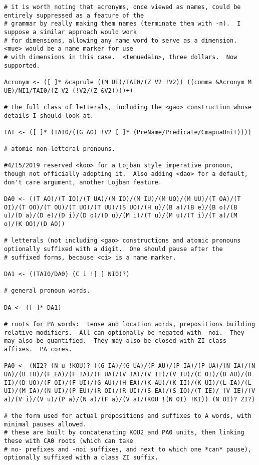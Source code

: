 \documentclass[12pt]{book}
\begin{document}
{\begin{verbatim}
# it is worth noting that acronyms, once viewed as names, could be entirely suppressed as a feature of the
# grammar by really making them names (terminate them with -n).  I suppose a similar approach would work
# for dimensions, allowing any name word to serve as a dimension.  <mue> would be a name marker for use
# with dimensions in this case.  <temuedain>, three dollars.  Now supported.

Acronym <- ([ ]* &caprule ((M UE)/TAI0/(Z V2 !V2)) ((comma &Acronym M UE)/NI1/TAI0/(Z V2 (!V2/(Z &V2))))+)

# the full class of letterals, including the <gao> construction whose details I should look at.

TAI <- ([ ]* (TAI0/((G AO) !V2 [ ]* (PreName/Predicate/CmapuaUnit))))

# atomic non-letteral pronouns.

#4/15/2019 reserved <koo> for a Lojban style imperative pronoun, though not officially adopting it.  Also adding <dao> for a default, don't care argument, another Lojban feature.

DA0 <- ((T AO)/(T IO)/(T UA)/(M IO)/(M IU)/(M UO)/(M UU)/(T OA)/(T OI)/(T OO)/(T OU)/(T UO)/(T UU)/(S UO)/(H u)/(B a)/(B e)/(B o)/(B u)/(D a)/(D e)/(D i)/(D o)/(D u)/(M i)/(T u)/(M u)/(T i)/(T a)/(M o)/(K OO)/(D AO))

# letterals (not including <gao> constructions and atomic pronouns optionally suffixed with a digit.  One should pause after the
# suffixed forms, because <ci> is a name marker.

DA1 <- ((TAI0/DA0) (C i ![ ] NI0)?)

# general pronoun words.

DA <- ([ ]* DA1)

# roots for PA words:  tense and location words, prepositions building relative modifiers.  All can optionally be negated with -noi.  They may also be quantified.  They may also be closed with ZI class affixes.  PA cores.

PA0 <- (NI2? (N u !KOU)? ((G IA)/(G UA)/(P AU)/(P IA)/(P UA)/(N IA)/(N UA)/(B IU)/(F EA)/(F IA)/(F UA)/(V IA)/(V II)/(V IU)/(C OI)/(D AU)/(D II)/(D UO)/(F OI)/(F UI)/(G AU)/(H EA)/(K AU)/(K II)/(K UI)/(L IA)/(L UI)/(M IA)/(N UI)/(P EU)/(R OI)/(R UI)/(S EA)/(S IO)/(T IE)/ (V IE)/(V a)/(V i)/(V u)/(P a)/(N a)/(F a)/(V a)/(KOU !(N OI) !KI)) (N OI)? ZI?)

# the form used for actual prepositions and suffixes to A words, with minimal pauses allowed.
# these are built by concatenating KOU2 and PA0 units, then linking these with CA0 roots (which can take
# no- prefixes and -noi suffixes, and next to which one *can* pause), optionally suffixed with a class ZI suffix.


\end{verbatim}}
\end{document}
